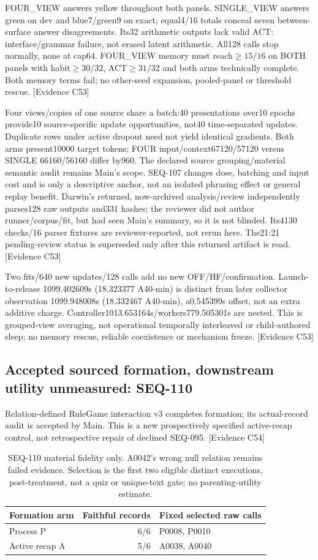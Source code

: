 \documentclass[11pt]{article}
\newcommand{\ev}[1]{\textsf{[Evidence #1]}}
\begin{document}
FOUR\_VIEW answers yellow throughout both panels. SINGLE\_VIEW answers green
on dev and blue7/green9 on exact; equal4/16 totals conceal seven between-surface
answer disagreements. Its32 arithmetic outputs lack valid ACT: interface/grammar
failure, not erased latent arithmetic. All128 calls stop normally, none at cap64.
FOUR\_VIEW memory must reach$\geq15/16$ on BOTH panels with habit$\geq30/32$,
ACT$\geq31/32$ and both arms technically complete. Both memory terms fail;
no other-seed expansion, pooled-panel or threshold rescue. \ev{C53}

Four views/copies of one source share a batch:40 presentations over10 epochs
provide10 source-specific update opportunities, not40 time-separated updates.
Duplicate rows under active dropout need not yield identical gradients. Both
arms present10000 target tokens; FOUR input/context67120/57120 versus SINGLE
66160/56160 differ by960. The declared source grouping/material semantic audit
remains Main's scope. SEQ-107 changes dose, batching and input cost and is only
a descriptive anchor, not an isolated phrasing effect or general replay benefit.
Darwin's returned, now-archived analysis/review independently parses128 raw
outputs and331 hashes; the reviewer did not author runner/corpus/fit, but had
seen Main's summary, so it is not blinded. Its4130 checks/16 parser fixtures
are reviewer-reported, not rerun here. The21:21 pending-review status is
superseded only after this returned artifact is read. \ev{C53}

Two fits/640 new updates/128 calls add no new OFF/HF/confirmation. Launch-to-release
1099.402609s (18.323377 A40-min) is distinct from later collector observation
1099.948008s (18.332467 A40-min), a0.545399s offset, not an extra additive charge.
Controller1013.653164s/workers779.505301s are nested. This is grouped-view
averaging, not operational temporally interleaved or child-authored sleep;
no memory rescue, reliable coexistence or mechanism freeze. \ev{C53}

\subsection{Accepted sourced formation, downstream utility unmeasured: SEQ-110}
Relation-defined RuleGame interaction v3 completes formation; its actual-record
audit is accepted by Main. This is a new prospectively specified active-recap
control, not retrospective repair of declined SEQ-095. \ev{C54}

\begin{table}[ht]
\centering\small
\begin{tabular}{lrl}
\toprule
Formation arm & Faithful records & Fixed selected raw calls \\
\midrule
Process P & 6/6 & P0008, P0010 \\
Active recap A & 5/6 & A0038, A0040 \\
\bottomrule
\end{tabular}
\caption{SEQ-110 material fidelity only. A0042's wrong null relation remains
failed evidence. Selection is the first two eligible distinct executions,
post-treatment, not a quiz or unique-text gate; no parenting-utility estimate.}
\label{tab:seq110-formation}
\end{table}
\end{document}
